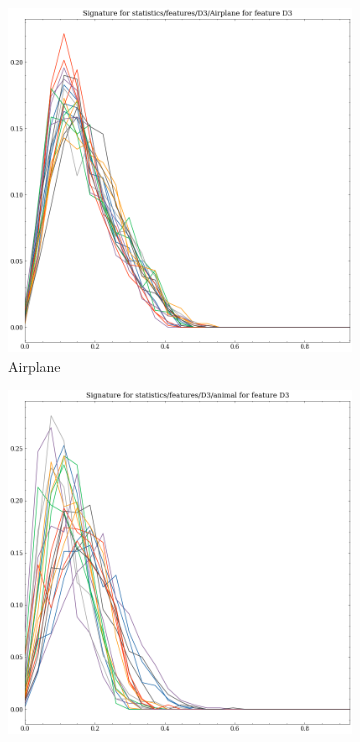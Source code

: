 \begin{figure}[t!p]
    \centering
    \begin{subfigure}[b]{0.23\textwidth}
        \includegraphics[width=\textwidth]{assets/feature_extraction/D3/Airplane.png}
        \caption{Airplane}
    \end{subfigure}
    \hfill
    \begin{subfigure}[b]{0.23\textwidth}
        \includegraphics[width=\textwidth]{assets/feature_extraction/D3/animal.png}

\end{subfigure}
\end{figure}
